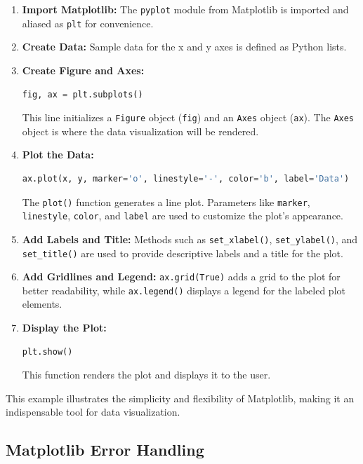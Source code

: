 \begin{enumerate}
	\item \textbf{Import Matplotlib:} 
	The \texttt{pyplot} module from Matplotlib is imported and aliased as \texttt{plt} for convenience.
	
	\item \textbf{Create Data:}
	Sample data for the x and y axes is defined as Python lists.
	
	\item \textbf{Create Figure and Axes:}
	\begin{lstlisting}[language=Python]
		fig, ax = plt.subplots()
	\end{lstlisting}
	This line initializes a \texttt{Figure} object (\texttt{fig}) and an \texttt{Axes} object (\texttt{ax}). The \texttt{Axes} object is where the data visualization will be rendered.
	
	\item \textbf{Plot the Data:}
	\begin{lstlisting}[language=Python]
		ax.plot(x, y, marker='o', linestyle='-', color='b', label='Data')
	\end{lstlisting}
	The \texttt{plot()} function generates a line plot. Parameters like \texttt{marker}, \texttt{linestyle}, \texttt{color}, and \texttt{label} are used to customize the plot's appearance.
	
	\item \textbf{Add Labels and Title:}
	Methods such as \texttt{set\_xlabel()}, \texttt{set\_ylabel()}, and \texttt{set\_title()} are used to provide descriptive labels and a title for the plot.
	
	\item \textbf{Add Gridlines and Legend:}
	\texttt{ax.grid(True)} adds a grid to the plot for better readability, while \texttt{ax.legend()} displays a legend for the labeled plot elements.
	
	\item \textbf{Display the Plot:}
	\begin{lstlisting}[language=Python]
		plt.show()
	\end{lstlisting}
	This function renders the plot and displays it to the user.
\end{enumerate}

This example illustrates the simplicity and flexibility of Matplotlib, making it an indispensable tool for data visualization.



\subsection{Matplotlib Error Handling}

